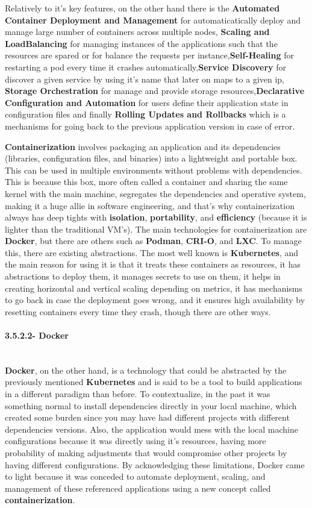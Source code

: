Relatively to it's key features, on the other hand there is the \textbf{Automated Container Deployment and Management} for automaticatically deploy and manage large number of containers across multiple nodes, \textbf{Scaling and LoadBalancing} for managing instances of the applications such that the resources are spared or for balance the requests per instance,\textbf{Self-Healing} for restarting a pod every time it crashes automatically,\textbf{Service Discovery} for discover a given service by using it's name that later on maps to a given ip, \textbf{Storage Orchestration} for manage and provide storage resources,\textbf{Declarative Configuration and Automation} for users define their application state in configuration files and finally \textbf{Rolling Updates and Rollbacks} which is a mechanisms for going back to the previous application version in case of error.

\textbf{Containerization} involves packaging an application and its dependencies (libraries, configuration files, and binaries) into a lightweight and portable box. This can be used in multiple environments without problems with dependencies. This is because this box, more often called a container and  sharing the same kernel with the main machine, segregates the dependencies and operative system, making it a huge allie in software engineering, and that's why containerization always has deep tights with \textbf{isolation}, \textbf{portability}, and \textbf{efficiency} (because it is lighter than the traditional VM's). The main technologies for containerization are \textbf{Docker}, but there are others such as \textbf{Podman}, \textbf{CRI-O}, and \textbf{LXC}. To manage this, there are existing abstractions. The most well known is \textbf{Kubernetes}, and the main reason for using it is that it treats these containers as resources, it has abstractions to deploy them, it manages secrets to use on them, it helps in creating horizontal and vertical scaling depending on metrics, it has mechanisms to go back in case the deployment goes wrong, and it ensures high availability by resetting containers every time they crash, though there are other ways.


\paragraph{3.5.2.2- Docker}\mbox{}\\
\textbf{Docker}, on the other hand, is a  technology that could be abstracted by the previously mentioned \textbf{Kubernetes} and is said to be a tool to build applications in a different paradigm than before. To contextualize, in the past it was something normal to install dependencies directly in your local machine, which created some burden since you may have had different projects with different dependencies versions. Also, the application would mess with the local machine configurations because it was directly using it's resources, having more probability of making adjustments that would compromise other projects by having different configurations. By acknowledging these limitations, Docker came to light because it was conceded to automate deployment, scaling, and management of these referenced applications using a new concept called \textbf{containerization}. 

